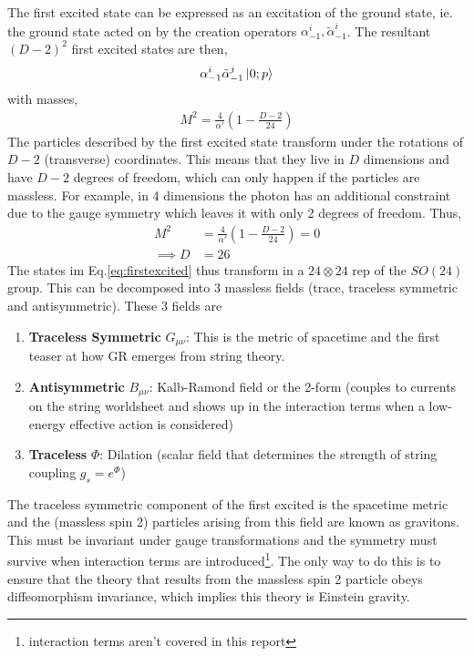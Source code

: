 \documentclass{article}
\providecommand{\brak}[1]{\ensuremath{\left(#1\right)}} %
\begin{document}
\begin{enumerate}
    The first excited state can be expressed as an excitation of the ground state, ie. the ground state acted on by the creation operators $\alpha^i_{-1},\tilde{\alpha}^i_{-1}$. The resultant $(D-2)^2$ first excited states are then,
    \begin{align}
        \alpha^i_{-1}\tilde{\alpha}^j_{-1}\ket{0;p}\label{eq:firstexcited}
    \end{align}
    with masses,
    \begin{align}
        M^2 = \frac{4}{\alpha'}\brak{{1-\frac{D-2}{24}}}
    \end{align}
    The particles described by the first excited state transform under the rotations of $D-2$ (transverse) coordinates. This means that they live in $D$ dimensions and have $D-2$ degrees of freedom, which can only happen if the particles are massless. For example, in 4 dimensions the photon has an additional constraint due to the gauge symmetry which leaves it with only 2 degrees of freedom. Thus,
    \begin{align}
        M^2 &= \frac{4}{\alpha'}\brak{{1-\frac{D-2}{24}}}=0\\
        \implies D&=26
    \end{align}
    The states im Eq.\eqref{eq:firstexcited} thus transform in a $24\otimes24$ rep of the $SO(24)$ group. This can be decomposed into 3 massless fields (trace, traceless symmetric and antisymmetric). These 3 fields are
    \begin{enumerate}
        \item \textbf{Traceless Symmetric} $G_{\mu\nu}$: This is the metric of spacetime and the first teaser at how GR emerges from string theory.
        \item \textbf{Antisymmetric} $B_{\mu\nu}$: Kalb-Ramond field or the 2-form (couples to currents on the string worldsheet and shows up in the interaction terms when a low-energy effective action is considered)
        \item \textbf{Traceless} $\Phi$: Dilation (scalar field that determines the strength of string coupling $g_s=e^\Phi$)
    \end{enumerate}
\end{enumerate}
The traceless symmetric component of the first excited is the spacetime metric and the (massless spin 2) particles arising from this field are known as gravitons. This must be invariant under gauge transformations and the symmetry must survive when interaction terms are introduced\footnote{interaction terms aren't covered in this report}. The only way to do this is to ensure that the theory that results from the massless spin 2 particle obeys diffeomorphism invariance, which implies this theory is Einstein gravity.\\
\end{document}
